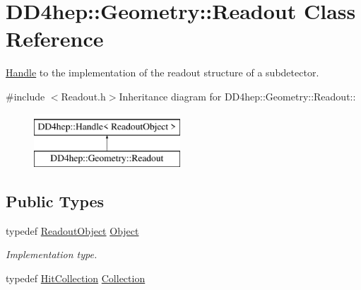 \hypertarget{class_d_d4hep_1_1_geometry_1_1_readout}{
\section{DD4hep::Geometry::Readout Class Reference}
\label{class_d_d4hep_1_1_geometry_1_1_readout}
}


\hyperlink{class_d_d4hep_1_1_handle}{Handle} to the implementation of the readout structure of a subdetector.  


{\ttfamily \#include $<$Readout.h$>$}Inheritance diagram for DD4hep::Geometry::Readout::\begin{figure}[H]
\begin{center}
\leavevmode
\includegraphics[height=2cm]{class_d_d4hep_1_1_geometry_1_1_readout}
\end{center}
\end{figure}
\subsection*{Public Types}
\begin{DoxyCompactItemize}
\item 
typedef \hyperlink{class_d_d4hep_1_1_geometry_1_1_readout_object}{ReadoutObject} \hyperlink{class_d_d4hep_1_1_geometry_1_1_readout_ae25c79e6b7a94df1de7b1a2cf6df7ae4}{Object}
\begin{DoxyCompactList}\small\item\em Implementation type. \item\end{DoxyCompactList}\item 
typedef \hyperlink{class_d_d4hep_1_1_geometry_1_1_hit_collection}{HitCollection} \hyperlink{class_d_d4hep_1_1_geometry_1_1_readout_ac1c39a13ec9bd42d658319fa48cac81d}{Collection}
\end{DoxyCompactItemize}
